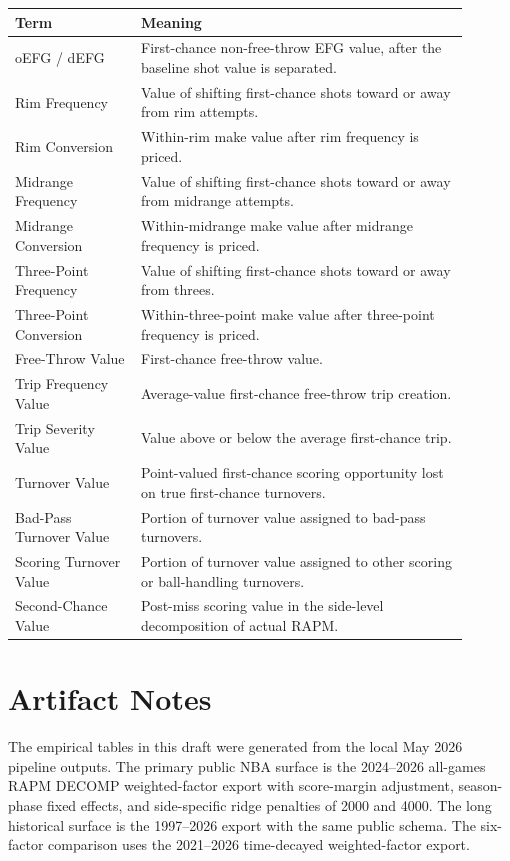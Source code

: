 \documentclass[11pt]{article}
\begin{document}
\begin{longtable}{p{0.25\linewidth}p{0.65\linewidth}}
\toprule
Term & Meaning\\
\midrule
oEFG / dEFG & First-chance non-free-throw EFG value, after the baseline shot value is separated.\\
Rim Frequency & Value of shifting first-chance shots toward or away from rim attempts.\\
Rim Conversion & Within-rim make value after rim frequency is priced.\\
Midrange Frequency & Value of shifting first-chance shots toward or away from midrange attempts.\\
Midrange Conversion & Within-midrange make value after midrange frequency is priced.\\
Three-Point Frequency & Value of shifting first-chance shots toward or away from threes.\\
Three-Point Conversion & Within-three-point make value after three-point frequency is priced.\\
Free-Throw Value & First-chance free-throw value.\\
Trip Frequency Value & Average-value first-chance free-throw trip creation.\\
Trip Severity Value & Value above or below the average first-chance trip.\\
Turnover Value & Point-valued first-chance scoring opportunity lost on true first-chance turnovers.\\
Bad-Pass Turnover Value & Portion of turnover value assigned to bad-pass turnovers.\\
Scoring Turnover Value & Portion of turnover value assigned to other scoring or ball-handling turnovers.\\
Second-Chance Value & Post-miss scoring value in the side-level decomposition of actual RAPM.\\
\bottomrule
\end{longtable}

\section{Artifact Notes}

The empirical tables in this draft were generated from the local May 2026
pipeline outputs.  The primary public NBA surface is the 2024--2026 all-games
RAPM DECOMP weighted-factor export with score-margin adjustment, season-phase
fixed effects, and side-specific ridge penalties of 2000 and 4000.  The long
historical surface is the 1997--2026 export with the same public schema.  The
six-factor comparison uses the 2021--2026 time-decayed weighted-factor export.
\end{document}
